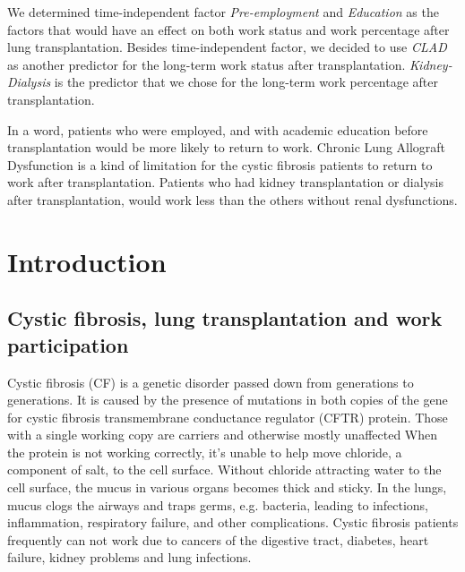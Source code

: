 \documentclass[11pt, a4paper]{article}\usepackage[]{graphicx}\usepackage[]{color}
\begin{document}
We determined time-independent factor \textit{Pre-employment} and \textit{Education} as the factors that would have an effect on both work status and work percentage after lung transplantation. Besides time-independent factor, we decided to use \textit{CLAD} as another predictor for the long-term work status after transplantation. \textit{Kidney-Dialysis} is the predictor that we chose for the long-term work percentage after transplantation.

In a word, patients who were employed, and with academic education before transplantation would be more likely to return to work. Chronic Lung Allograft Dysfunction is a kind of limitation for the cystic fibrosis patients to return to work after transplantation. Patients who had kidney transplantation or dialysis after transplantation, would work less than the others without renal dysfunctions.

\vspace{2cm}

\section{Introduction} \label{sec:intro}

\subsection*{Cystic fibrosis, lung transplantation and work participation} 

Cystic fibrosis (CF) is a genetic disorder passed down from generations to generations. It is caused by the presence of mutations in both copies of the gene for cystic fibrosis transmembrane conductance regulator (CFTR) protein. Those with a single working copy are carriers and otherwise mostly unaffected When the protein is not working correctly, it's unable to help move chloride, a component of salt, to the cell surface. Without chloride attracting water to the cell surface, the mucus in various organs becomes thick and sticky. In the lungs, mucus clogs the airways and traps germs, e.g. bacteria, leading to infections, inflammation, respiratory failure, and other complications. Cystic fibrosis patients frequently can not work due to cancers of the digestive tract, diabetes, heart failure, kidney problems and lung infections.
  
\end{document}
